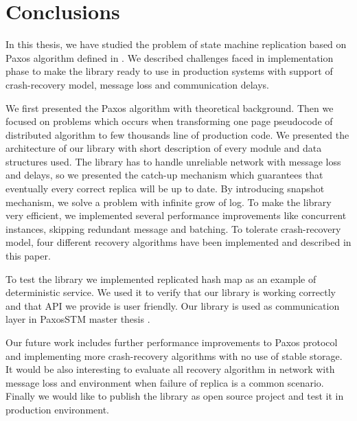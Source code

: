 \chapter{Conclusions}

%

In this thesis, we have studied the problem of state machine replication based
on Paxos algorithm defined in \cite{Lam98}. We described challenges faced in
implementation phase to make the library ready to use in production systems
with support of crash-recovery model, message loss and communication delays.

We first presented the Paxos algorithm with theoretical background. Then we
focused on problems which occurs when transforming one page pseudocode of
distributed algorithm to few thousands line of production code. We presented
the architecture of our library with short description of every module and data
structures used. The library has to handle unreliable network with message
loss and delays, so we presented the catch-up mechanism which guarantees that
eventually every correct replica will be up to date. By introducing snapshot
mechanism, we solve a problem with infinite grow of log. To make the library
very efficient, we implemented several performance improvements like concurrent
instances, skipping redundant message and batching. To tolerate crash-recovery
model, four different recovery algorithms have been implemented and described in
this paper.

To test the library we implemented replicated hash map as an example of
deterministic service. We used it to verify that our library is working
correctly and that API we provide is user friendly. Our library is used as 
communication layer in PaxosSTM master thesis \cite{Tad10}.

Our future work includes further performance improvements to Paxos protocol and
implementing more crash-recovery algorithms with no use of stable storage.  It
would be also interesting to evaluate all recovery algorithm in network with
message loss and environment when failure of replica is a common scenario.
Finally we would like to publish the library as open source project and test it
in production environment.

